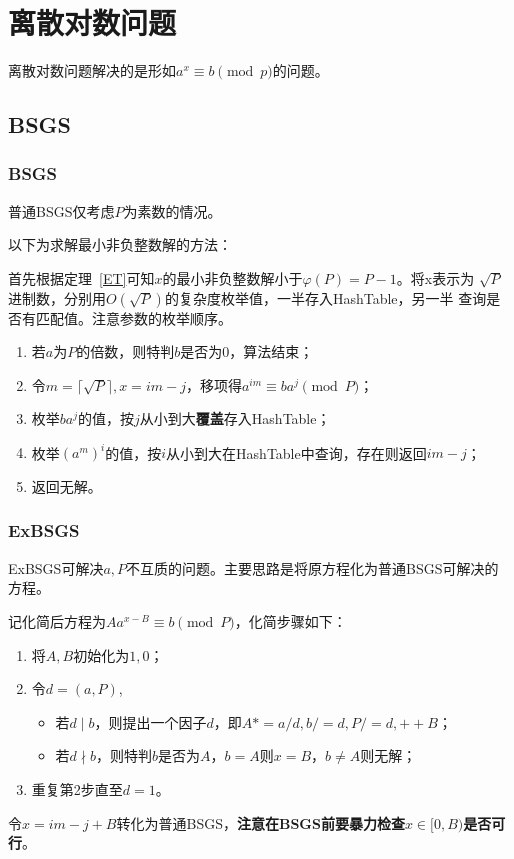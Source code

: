 \section{离散对数问题}
离散对数问题解决的是形如$a^x\equiv b\pmod{p}$的问题。
\subsection{BSGS}\label{BSGS}
\subsubsection{BSGS}
普通BSGS仅考虑$P$为素数的情况。

以下为求解最小非负整数解的方法：

首先根据定理~\ref{ET}可知$x$的最小非负整数解小于$\varphi(P)=P-1$。将x表示为
$\sqrt{P}$进制数，分别用$O(\sqrt{P})$的复杂度枚举值，一半存入HashTable，另一半
查询是否有匹配值。注意参数的枚举顺序。

\begin{enumerate}
    \item 若$a$为$P$的倍数，则特判$b$是否为$0$，算法结束；
    \item 令$m=\lceil\sqrt{P}\rceil,x=im-j$，移项得$a^{im}\equiv ba^j\pmod{P}$；
    \item 枚举$ba^j$的值，按$j$从小到大{\bfseries 覆盖}存入HashTable；
    \item 枚举$(a^m)^i$的值，按$i$从小到大在HashTable中查询，存在则返回$im-j$；
    \item 返回无解。
\end{enumerate}

\subsubsection{ExBSGS}
ExBSGS可解决$a,P$不互质的问题。主要思路是将原方程化为普通BSGS可解决的方程。

记化简后方程为$Aa^{x-B}\equiv b\pmod{P}$，化简步骤如下：
\begin{enumerate}
    \item 将$A,B$初始化为$1,0$；
    \item 令$d=(a,P)$,
    \begin{itemize}
        \item 若$d\mid b$，则提出一个因子$d$，即$A*=a/d,b/=d,P/=d,++B$；
        \item 若$d\nmid b$，则特判$b$是否为$A$，$b=A$则$x=B$，$b\neq A$则无解；
    \end{itemize}
    \item 重复第2步直至$d=1$。
\end{enumerate}
令$x=im-j+B$转化为普通BSGS，{\bfseries 注意在BSGS前要暴力检查$x\in[0,B)$是否可行}。

